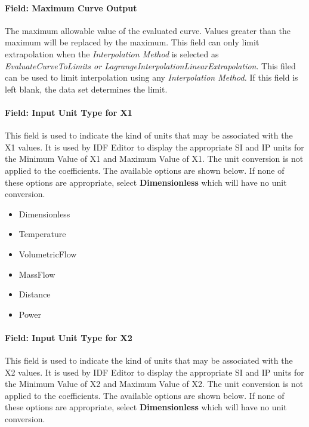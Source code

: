 \paragraph{Field: Maximum Curve Output}\label{field-maximum-curve-output-000}

The maximum allowable value of the evaluated curve. Values greater than the maximum will be replaced by the maximum. This field can only limit extrapolation when the \emph{Interpolation Method} is selected as \emph{EvaluateCurveToLimits or LagrangeInterpolationLinearExtrapolation}. This filed can be used to limit interpolation using any \emph{Interpolation Method.} If this field is left blank, the data set determines the limit.

\paragraph{Field: Input Unit Type for X1}\label{field-input-unit-type-for-x1-1}

This field is used to indicate the kind of units that may be associated with the X1 values. It is used by IDF Editor to display the appropriate SI and IP units for the Minimum Value of X1 and Maximum Value of X1. The unit conversion is not applied to the coefficients. The available options are shown below. If none of these options are appropriate, select \textbf{Dimensionless} which will have no unit conversion.

\begin{itemize}
\item
  Dimensionless
\item
  Temperature
\item
  VolumetricFlow
\item
  MassFlow
\item
  Distance
\item
  Power
\end{itemize}

\paragraph{Field: Input Unit Type for X2}\label{field-input-unit-type-for-x2}

This field is used to indicate the kind of units that may be associated with the X2 values. It is used by IDF Editor to display the appropriate SI and IP units for the Minimum Value of X2 and Maximum Value of X2. The unit conversion is not applied to the coefficients. The available options are shown below. If none of these options are appropriate, select \textbf{Dimensionless} which will have no unit conversion.

